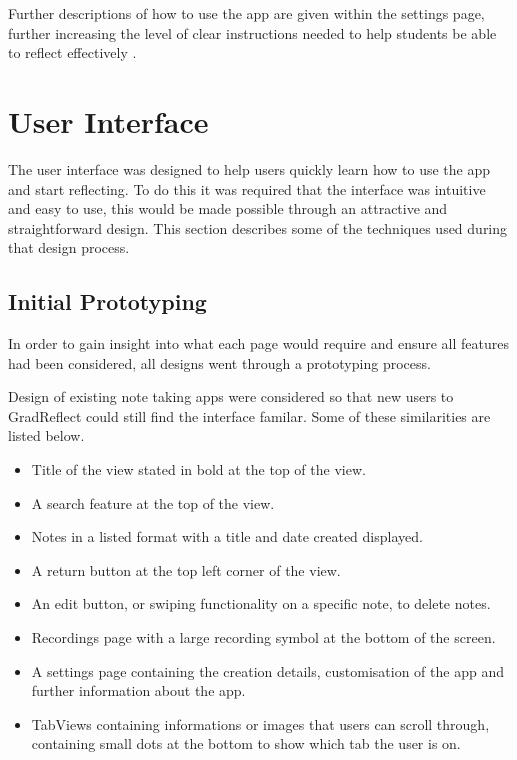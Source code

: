\documentclass{l4proj}
\begin{document}
Further descriptions of how to use the app are given within the settings page, further increasing the level of clear instructions needed to help students be able to reflect effectively \citep{bruno_reflective_2018}.

\section{User Interface}

The user interface was designed to help users quickly learn how to use the app and start reflecting. To do this it was required that the interface was intuitive and easy to use, this would be made possible through an attractive and straightforward design. This section describes some of the techniques used during that design process.

\subsection{Initial Prototyping}

In order to gain insight into what each page would require and ensure all features had been considered, all designs went through a prototyping process. 

Design of existing note taking apps were considered so that new users to GradReflect could still find the interface familar. Some of these similarities are listed below.

\begin{itemize}
    \item Title of the view stated in bold at the top of the view.
    \item A search feature at the top of the view.
    \item Notes in a listed format with a title and date created displayed.
    \item A return button at the top left corner of the view.
    \item An edit button, or swiping functionality on a specific note, to delete notes.
    \item Recordings page with a large recording symbol at the bottom of the screen.
    \item A settings page containing the creation details, customisation of the app and further information about the app.
    \item TabViews containing informations or images that users can scroll through, containing small dots at the bottom to show which tab the user is on.
\end{itemize}
\end{document}
